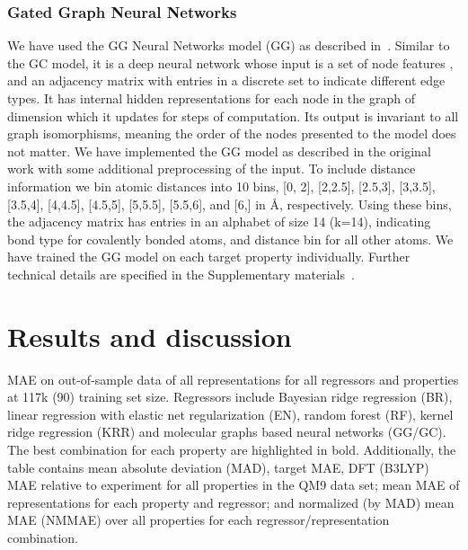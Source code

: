 \documentclass[reprint, superscriptaddress,
amsmath,amssymb, aps, prb,
]{revtex4-1}
\begin{document}
{\subsubsection{Gated Graph Neural Networks}
 We have used the GG Neural Networks model (GG) as described in~\citet{yujia}. 
Similar to the GC model, it is a deep neural network whose input is a set of node features , and an adjacency matrix  with entries in a discrete set  to indicate different edge types. 
It has internal hidden representations for each node in the graph  of dimension  which it updates for  steps of computation. 
Its output is invariant to all graph isomorphisms, meaning the order of the nodes presented to the model does not matter. 
 We have implemented the GG model as described in the original work with some additional preprocessing of the input. 
To include distance information we bin atomic distances into 10 bins, 
[0, 2],  [2,2.5], [2.5,3], [3,3.5], [3.5,4], [4,4.5], [4.5,5], [5,5.5], [5.5,6], and [6,]
in \AA, respectively. 
Using these bins, the adjacency matrix has entries in an alphabet of size 14 (k=14), 
indicating bond type for covalently bonded atoms, and distance bin for all other atoms. 
We have trained the GG model on each target property individually. 
Further technical details are specified in the Supplementary materials~\cite{supplementary}.



\section{Results and discussion}
\label{sec:results}

\begin{table*}[h!]
\centering
\caption{
\label{tab:order}
MAE on out-of-sample data of all representations for all regressors and properties at 117k (90) training set size. Regressors include Bayesian ridge regression (BR), linear regression with elastic net regularization (EN), random forest (RF), kernel ridge regression (KRR) and molecular graphs based neural networks (GG/GC). 
The best combination for each property are highlighted in bold. 
Additionally, the table contains mean absolute deviation (MAD), target MAE, DFT (B3LYP) MAE relative to experiment for all properties in the QM9 data set; mean MAE of representations for each property and regressor; and
normalized (by MAD) mean MAE (NMMAE) over all properties for each regressor/representation combination.
}




\end{table*}}
\end{document}
